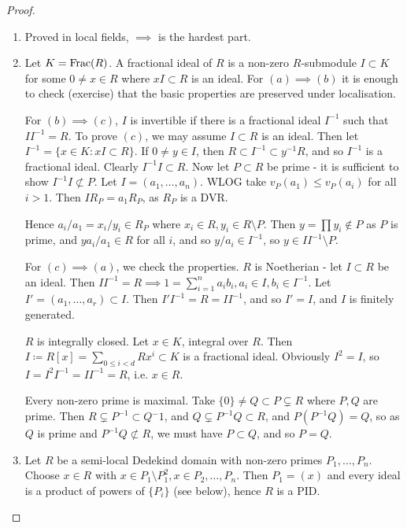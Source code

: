 \documentclass[10pt,a4paper]{article}
\begin{document}
\begin{proof}\hspace*{0cm}
  \begin{enumerate}
    \item Proved in local fields, $\implies$ is the hardest part.
    \item Let $K = \operatorname{Frac}(R)$. A fractional ideal of $R$ is a non-zero $R$-submodule $I \subset K$ for some $0 \neq x \in R$ where $xI \subset R$ is an ideal. For $(a)\implies (b)$ it is enough to check (exercise) that the basic properties are preserved under localisation.

    For $(b)\implies (c)$, $I$ is invertible if there is a fractional ideal $I^{-1}$ such that $II^{-1} = R$. To prove $(c)$, we may assume $I \subset R$ is an ideal. Then let $I^{-1} = \{x \in K : xI \subset R\}$. If $0 \neq y \in I$, then $R \subset I^{-1} \subset y^{-1}R$, and so $I^{-1}$ is a fractional ideal. Clearly $I^{-1}I \subset R$. Now let $P \subset R$ be prime - it is sufficient to show $I^{-1}I \nsubset P$. Let $I = (a_1, \ldots, a_n)$. WLOG take $v_P(a_1) \leq v_P(a_i)$ for all $i >1$. Then $IR_P = a_1R_P$, as $R_P$ is a DVR.

    Hence $a_i/a_1 = x_i/y_i \in R_P$ where $x_i \in R, y_i \in R\setminus P$. Then $y = \prod y_i \notin P$ as $P$ is prime, and $ya_i/a_1 \in R$ for all $i$, and so $y/a_i \in I^{-1}$, so $y \in II^{-1}\setminus P$.

    For $(c)\implies (a)$, we check the properties. $R$ is Noetherian - let $I \subset R$ be an ideal. Then $II^{-1} =R \implies 1 = \sum_{i=1}^n a_ib_i, a_i \in I, b_i \in I^{-1}$. Let $I' = (a_1, \ldots, a_r) \subset I$. Then $I'I^{-1} = R = II^{-1}$, and so $I' = I$, and $I$ is finitely generated.

    $R$ is integrally closed. Let $x \in K$, integral over $R$. Then $I \coloneqq R[x] = \sum_{0\leq i < d} Rx^i \subset K$ is a fractional ideal. Obviously $I^2 = I$, so $I = I^2I^{-1} = II^{-1} = R$, i.e. $x \in R$.

    Every non-zero prime is maximal. Take $\{0\} \neq Q \subset P \subsetneq R$ where $P,Q$ are prime. Then $R \subsetneq P^{-1} \subset Q{^-1}$, and $Q\subsetneq P^{-1}Q \subset R$, and $P(P^{-1}Q) = Q$, so as $Q$ is prime and $P^{-1}Q \nsubset R$, we must have $P\subset Q$, and so $P= Q$.

    \item Let $R$ be a semi-local Dedekind domain with non-zero primes $P_1, \ldots, P_n$. Choose $x \in R$ with $x \in P_1 \setminus P_1^2, x\in P_2, \ldots, P_n$. Then $P_1 = (x)$ and every ideal is a product of powers of $\{P_i\}$ (see below), hence $R$ is a PID.
  \end{enumerate}
\end{proof}
\end{document}
